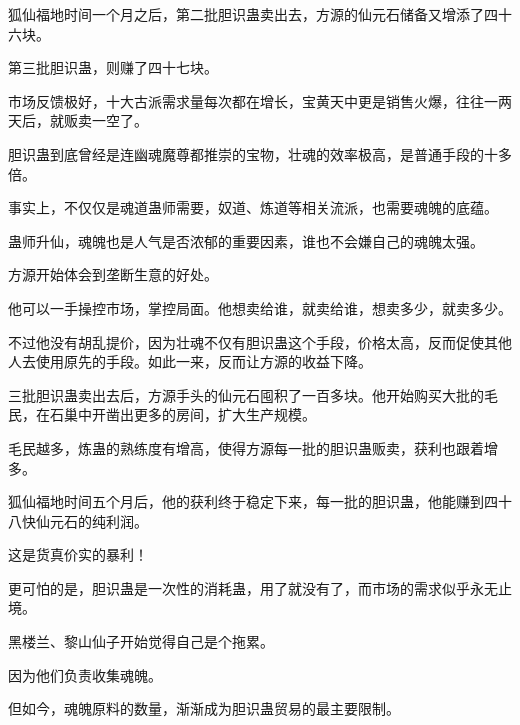 \begin{this_body}
狐仙福地时间一个月之后，第二批胆识蛊卖出去，方源的仙元石储备又增添了四十六块。

第三批胆识蛊，则赚了四十七块。

市场反馈极好，十大古派需求量每次都在增长，宝黄天中更是销售火爆，往往一两天后，就贩卖一空了。

胆识蛊到底曾经是连幽魂魔尊都推崇的宝物，壮魂的效率极高，是普通手段的十多倍。

事实上，不仅仅是魂道蛊师需要，奴道、炼道等相关流派，也需要魂魄的底蕴。

蛊师升仙，魂魄也是人气是否浓郁的重要因素，谁也不会嫌自己的魂魄太强。

方源开始体会到垄断生意的好处。

他可以一手操控市场，掌控局面。他想卖给谁，就卖给谁，想卖多少，就卖多少。

不过他没有胡乱提价，因为壮魂不仅有胆识蛊这个手段，价格太高，反而促使其他人去使用原先的手段。如此一来，反而让方源的收益下降。

三批胆识蛊卖出去后，方源手头的仙元石囤积了一百多块。他开始购买大批的毛民，在石巢中开凿出更多的房间，扩大生产规模。

毛民越多，炼蛊的熟练度有增高，使得方源每一批的胆识蛊贩卖，获利也跟着增多。

狐仙福地时间五个月后，他的获利终于稳定下来，每一批的胆识蛊，他能赚到四十八快仙元石的纯利润。

这是货真价实的暴利！

更可怕的是，胆识蛊是一次性的消耗蛊，用了就没有了，而市场的需求似乎永无止境。

黑楼兰、黎山仙子开始觉得自己是个拖累。

因为他们负责收集魂魄。

但如今，魂魄原料的数量，渐渐成为胆识蛊贸易的最主要限制。

\end{this_body}


